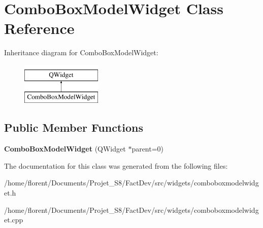 \hypertarget{classComboBoxModelWidget}{\section{Combo\-Box\-Model\-Widget Class Reference}
\label{classComboBoxModelWidget}
}
Inheritance diagram for Combo\-Box\-Model\-Widget\-:\begin{figure}[H]
\begin{center}
\leavevmode
\includegraphics[height=2.000000cm]{d5/d79/classComboBoxModelWidget}
\end{center}
\end{figure}
\subsection*{Public Member Functions}
\begin{DoxyCompactItemize}
\item 
\hypertarget{classComboBoxModelWidget_a8632edda11e66ee50cfc89729b2feb3a}{{\bfseries Combo\-Box\-Model\-Widget} (Q\-Widget $\ast$parent=0)}\label{classComboBoxModelWidget_a8632edda11e66ee50cfc89729b2feb3a}

\end{DoxyCompactItemize}


The documentation for this class was generated from the following files\-:\begin{DoxyCompactItemize}
\item 
/home/florent/\-Documents/\-Projet\-\_\-\-S8/\-Fact\-Dev/src/widgets/comboboxmodelwidget.\-h\item 
/home/florent/\-Documents/\-Projet\-\_\-\-S8/\-Fact\-Dev/src/widgets/comboboxmodelwidget.\-cpp\end{DoxyCompactItemize}
